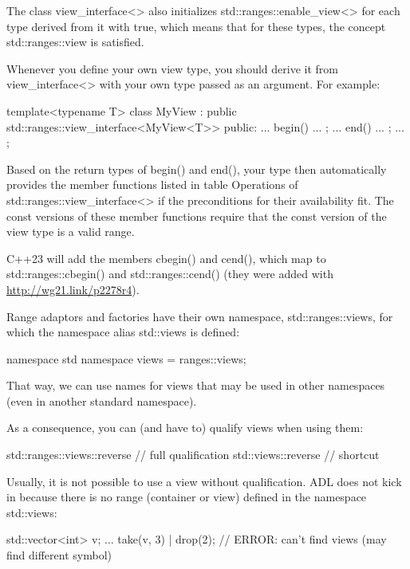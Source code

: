 The class view\_interface<> also initializes std::ranges::enable\_view<> for each type derived from it with true, which means that for these types, the concept std::ranges::view is satisfied.

Whenever you define your own view type, you should derive it from view\_interface<> with your own type passed as an argument. For example:

\begin{cpp}
template<typename T>
class MyView : public std::ranges::view_interface<MyView<T>> {
	public:
	... begin() ... ;
	... end() ... ;
	...
};
\end{cpp}

Based on the return types of begin() and end(), your type then automatically provides the member functions listed in table Operations of std::ranges::view\_interface<> if the preconditions for their availability fit. The const versions of these member functions require that the const version of the view type is a valid range.

C++23 will add the members cbegin() and cend(), which map to std::ranges::cbegin() and std::ranges::cend() (they were added with \url{http://wg21.link/p2278r4}).


Range adaptors and factories have their own namespace, std::ranges::views, for which the namespace alias std::views is defined:

\begin{cpp}
namespace std {
	namespace views = ranges::views;
}
\end{cpp}

That way, we can use names for views that may be used in other namespaces (even in another standard namespace).

As a consequence, you can (and have to) qualify views when using them:

\begin{cpp}
std::ranges::views::reverse // full qualification
std::views::reverse // shortcut
\end{cpp}

Usually, it is not possible to use a view without qualification. ADL does not kick in because there is no range (container or view) defined in the namespace std::views:

\begin{cpp}
std::vector<int> v;
...
take(v, 3) | drop(2); // ERROR: can’t find views (may find different symbol)
\end{cpp}

